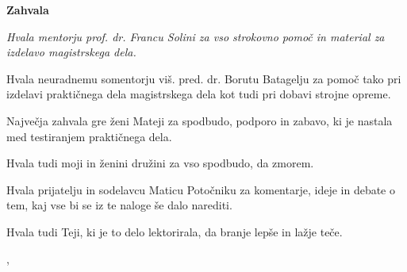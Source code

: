 \thispagestyle{empty}

\begin{center}
{\Large \textbf{\sc Zahvala}}
\end{center}
\vspace{0.5cm}

{\it\noindent
Hvala mentorju prof. dr. Francu Solini za vso strokovno pomoč in material za izdelavo magistrskega dela.

Hvala neuradnemu somentorju viš. pred. dr. Borutu Batagelju za pomoč tako pri izdelavi praktičnega dela magistrskega dela kot tudi pri dobavi strojne opreme.

Največja zahvala gre ženi Mateji za spodbudo, podporo in zabavo, ki je nastala med testiranjem praktičnega dela.

Hvala tudi moji in ženini družini za vso spodbudo, da zmorem.

Hvala prijatelju in sodelavcu Maticu Potočniku za komentarje, ideje in debate o tem, kaj vse bi se iz te naloge še dalo narediti.

Hvala tudi Teji, ki je to delo lektorirala, da branje lepše in lažje teče.

\vspace{0.5cm} \hfill \myname, \myyear
}
